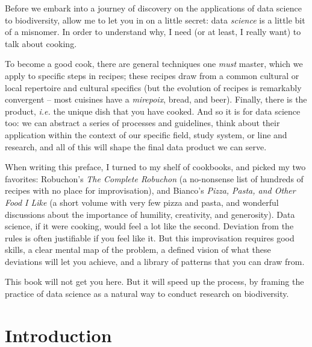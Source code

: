 \documentclass[
  letterpaper,
]{scrbook}
\begin{document}

Before we embark into a journey of discovery on the applications of data
science to biodiversity, allow me to let you in on a little secret: data
\emph{science} is a little bit of a misnomer. In order to understand
why, I need (or at least, I really want) to talk about cooking.

To become a good cook, there are general techniques one \emph{must}
master, which we apply to specific steps in recipes; these recipes draw
from a common cultural or local repertoire and cultural specifics (but
the evolution of recipes is remarkably convergent -- most cuisines have
a \emph{mirepoix}, bread, and beer). Finally, there is the product,
\emph{i.e.} the unique dish that you have cooked. And so it is for data
science too: we can abstract a series of processes and guidelines, think
about their application within the context of our specific field, study
system, or line and research, and all of this will shape the final data
product we can serve.

When writing this preface, I turned to my shelf of cookbooks, and picked
my two favorites: Robuchon's \emph{The Complete Robuchon} (a no-nonsense
list of hundreds of recipes with no place for improvisation), and
Bianco's \emph{Pizza, Pasta, and Other Food I Like} (a short volume with
very few pizza and pasta, and wonderful discussions about the importance
of humility, creativity, and generosity). Data science, if it were
cooking, would feel a lot like the second. Deviation from the rules is
often justifiable if you feel like it. But this improvisation requires
good skills, a clear mental map of the problem, a defined vision of what
these deviations will let you achieve, and a library of patterns that
you can draw from.

This book will not get you here. But it will speed up the process, by
framing the practice of data science as a natural way to conduct
research on biodiversity.


\chapter{Introduction}\label{introduction}
\end{document}
